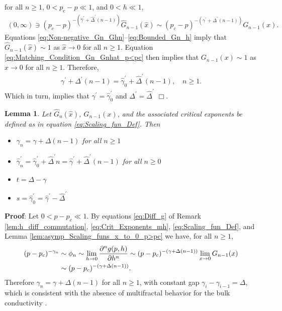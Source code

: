 \documentclass[english,12pt]{ttuthes}
\newtheorem{lemma}{Lemma}[chapter]
\newcommand{\gh}{\hat{\gamma}}
\newcommand{\Dh}{\hat{\Delta}}
\newcommand{\xh}{\hat{x}}
\begin{document}
for all $n\geq1$, $0<p_c-p\ll1$, and $0<h\ll1$,  
%
\begin{align}\label{eq:Matching_Condition_Gn_Gnhat_p<pc}
  (0,\infty)\ni(p_c-p)^{-(\gh^\prime+\Dh^\prime(n-1))}\hat{G}_{n-1}(\xh)
       \sim(p_c-p)^{-(\gamma^\prime+\Delta^\prime(n-1))}G_{n-1}(x).
\end{align}
%
Equations \eqref{eq:Non-negative_Gn_Ghn}--\eqref{eq:Bounded_Gn_h}
imply that $\hat{G}_{n-1}(\xh)\sim1$ as $\xh\to0$ for all $n\geq1$. Equation 
\eqref{eq:Matching_Condition_Gn_Gnhat_p<pc} then implies that
$G_{n-1}(x)\sim1$ as $x\to0$ for all $n\geq1$. Therefore, 
%
\begin{align*}
  \gamma^\prime+\Delta^\prime(n-1)=\gh_0^\prime+\Dh^\prime(n-1), \quad n\geq1.
\end{align*}
%
Which in turn, implies that $\gamma^\prime=\gh_0^\prime$ and $\Delta^\prime=\Dh^\prime$ $\Box$.
%
%
 \begin{lemma}\label{lem:Scaling_rel_t_s_gamman}
   Let $\hat{G}_n(\xh)$, $G_{n-1}(x)$, and the associated critical
   exponents be defined as in equation
   \eqref{eq:Scaling_fun_Def}. Then   
     \begin{itemize}
    \item[1)] $\gamma_n= \gamma+\Delta(n-1)$ for all $n\geq1$ 
    \item[2)] $\gh_n^\prime=\gh_0^\prime+\Dh^\prime n=\gh^\prime+\Dh^\prime(n-1)$ for all $n\geq0$ 
    \item[3)] $t=\Delta-\gamma$
    \item[4)] $s=\gh_0^\prime=\gh^\prime-\Dh^\prime$  
     \end{itemize}
 \end{lemma}
%
\noindent \textbf{Proof}:
%
Let $0<p-p_c\ll1$. By equations  \eqref{eq:Diff_g} of
Remark \ref{lem:h_diff_commutation}, \eqref{eq:Crit_Exponents_mh}, 
\eqref{eq:Scaling_fun_Def}, and Lemma
\ref{lem:asymp_Scaling_funs_x_to_0_p>pc} we have, for all $n\geq1$,
%
\begin{align*}
  (p-p_c)^{-\gamma_n}&\sim\phi_n
             \sim\lim_{h\to0}\frac{\partial^ng(p,h)}{\partial h^n}
             \sim(p-p_c)^{-(\gamma+\Delta(n-1))}\lim_{x\to0}G_{n-1}(x)\\
             &\sim(p-p_c)^{-(\gamma+\Delta(n-1))}.\notag 
\end{align*}
%
Therefore $\gamma_n=\gamma+\Delta(n-1)$ for all $n\geq1$, with constant gap
$\gamma_i-\gamma_{i-1}=\Delta$, which is consistent with the absence of multifractal
behavior for the bulk conductivity \cite{Stauffer-92}.
\end{document}
